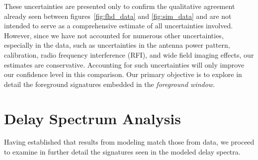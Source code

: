 \documentclass[preprint2,iop,numberedappendix]{emulateapj}
\begin{document}
These uncertainties are presented only to confirm the qualitative agreement already seen between figures~\ref{fig:fhd_data} and \ref{fig:sim_data} and are not intended to serve as a comprehensive estimate of all uncertainties involved. However, since we have not accounted for numerous other uncertainties, especially in the data, such as uncertainties in the antenna power pattern, calibration, radio frequency interference (RFI), and wide field imaging effects, our estimates are conservative. Accounting for such uncertainties will only improve our confidence level in this comparison. Our primary objective is to explore in detail the foreground signatures embedded in the {\it foreground window}.

\section{Delay Spectrum Analysis}\label{sec:delay-spectrum-analysis}

Having established that results from modeling match those from data, we proceed to examine in further detail the signatures seen in the modeled delay spectra. 
\end{document}

